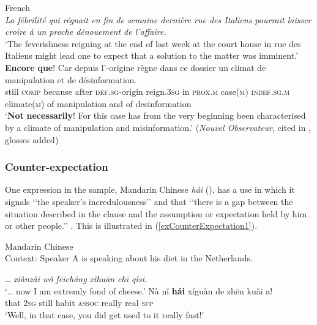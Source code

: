 \begin{exe}
	\ex French\label{exConcessiveInterjectionFrench2}\\
	\textit{La fébrilité qui régnait en fin de semaine dernière rue des Italiens pourrait laisser croire à un proche dénouement de l’affaire.}\\
	\lq The feverishness reigning at the end of last week at the court house in rue des Italiens might lead one to expect that a solution to the matter was imminent.'
	\exi{}\gll \textbf{Encore} \textbf{que}! Car depuis l’-origine règne dans ce dossier un climat de manipulation et de désinformation.\\
	still \textsc{comp} because after \textsc{def}.\textsc{sg}-origin reign.3\textsc{sg} in \textsc{prox}.\textsc{m} case(\textsc{m}) \textsc{indef}.\textsc{sg}.\textsc{m} climate(\textsc{m}) of manipulation and of desinformation\\
	\glt \lq \textbf{Not} \textbf{necessarily}! For this case has from the very beginning been characterised by a climate of manipulation and misinformation.' (\textit{Nouvel Observateur}, cited in \cite[192–193]{MosegaardHansen2008}, glosses added)
\end{exe}

\subsubsection{Counter-expectation}\label{sectionCounterExpectation}\largerpage
{}
One expression in the sample, Mandarin Chinese \textit{hái} (), has a use in which it signals \lq\lq the speaker's incredulousness\rq\rq{ }and that \lq\lq{}there is a gap between the situation described in the clause and the assumption or expectation held by him or other people.\rq\rq{ }\parencite[345]{BiqHuang2016}. This is illustrated in (\ref{exCounterExpectation1}).

\begin{exe}
	\ex Mandarin Chinese\label{exCounterExpectation1}\\
	Context: Speaker A is speaking about his diet in the Netherlands.
	\begin{xlist}
		… \textit{xiànzài wǒ fēicháng xǐhuān chī qìsi}.\\
		\lq … now I am extremly fond of cheese.'
		 \gll Nà nǐ \textbf{hái} xíguàn de zhēn kuài a!\\
		that 2\textsc{sg} still habit \textsc{assoc} really real \textsc{sfp}\\
		\glt \lq Well, in that case, you did get used to it really fast!'
		\\\parencite[110]{Wiedenhof2015}
	\end{xlist}
\end{exe}

